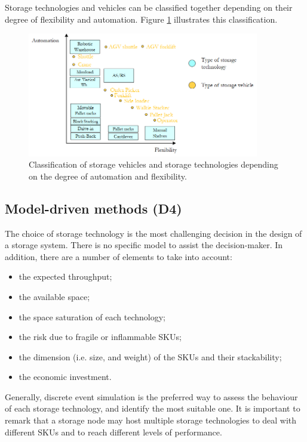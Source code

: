 \clearpage

Storage technologies and vehicles can be classified together depending on their degree of flexibility and automation. Figure \ref{fig_technologies} illustrates this classification.

\begin{figure}[hbt!]
\centering
\includegraphics[width=0.9\textwidth]{SectionWarehouses/design_figures/fig_technologies.png}
\captionsetup{type=figure}
\caption{Classification of storage vehicles and storage technologies depending on the degree of automation and flexibility.}
\label{fig_technologies}
\end{figure}

\subsection{Model-driven methods (D4)}
The choice of storage technology is the most challenging decision in the design of a storage system. There is no specific model to assist the decision-maker. In addition, there are a number of elements to take into account:

\begin{itemize}
    \item the expected throughput;
    \item the available space;
    \item the space saturation of each technology;
    \item the risk due to fragile or inflammable SKUs;
    \item the dimension (i.e. size, and weight) of the SKUs and their stackability;
    \item the economic investment.

\end{itemize}

Generally, discrete event simulation is the preferred way to assess the behaviour of each storage technology, and identify the most suitable one. It is important to remark that a storage node may host multiple storage technologies to deal with different SKUs and to reach different levels of performance.

